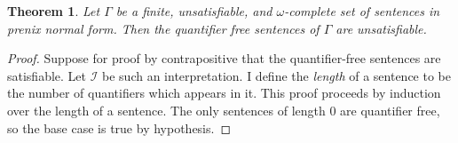 \documentclass[12pt]{article}
\newtheorem{theorem}{Theorem}[section]
\theoremstyle{definition}
\theoremstyle{remark}
\begin{document}
\begin{theorem}
	Let $\Gamma$ be a finite, unsatisfiable, and $\omega$-complete set of sentences in prenix normal form. Then the quantifier free sentences of $\Gamma$ are unsatisfiable.
\end{theorem}

\begin{proof}
	Suppose for proof by contrapositive that the quantifier-free sentences are satisfiable. Let $\mathscr{I}$ be such an interpretation. I define the \textit{length} of a sentence to be the number of quantifiers which appears in it. This proof proceeds by induction over the length of a sentence. The only sentences of length 0 are quantifier free, so the base case is true by hypothesis.
\end{proof}
\end{document}

